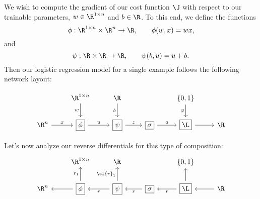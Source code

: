 We wish to compute the gradient of our cost function $\J$ with respect to our trainable parameters, $w\in\R^{1\times n}$ and $b\in\R$.  To this end, we define the functions
$$\phi:\R^{1\times n}\times\R^n\to\R,\qquad \phi(w,x)=wx,$$
and
$$\psi:\R\times\R\to\R,\qquad \psi(b,u)=u+b.$$
Then our logistic regression model for a single example follows the following network layout:

\begin{equation*}
	\begin{tikzcd}
		{}
		&\R^{1\times n}
		\arrow[d, swap, "w"]
		&\R^{}
		\arrow[d, swap, "b"]
		&{}
		&\{0,1\}
		\arrow[d, swap, "y"]
		&{}
		\\
		\R^n
		\arrow[r, "x"]
		&\boxed{\phi}
		\arrow[r, "u"]
		&\boxed{\psi}
		\arrow[r, "z"]
		&\boxed{\sigma}
		\arrow[r, "a"]
		&\boxed{\L}
		\arrow[r]
		&\R
	\end{tikzcd}
\end{equation*}

Let's now analyze our reverse differentials for this type of composition:
\begin{equation*}
	\begin{tikzcd}
		{}
		&\R^{1\times n}
		&\R^{}
		&{}
		&\{0,1\}
		&{}
		\\
		\R^n
		&\boxed{\phi}
		\arrow[l]
		\arrow[u, "r_1"]
		&\boxed{\psi}
		\arrow[l, "r"]
		\arrow[u, "\cl{r}_1"]
		&\boxed{\sigma}
		\arrow[l, "r"]
		&\boxed{\L}
		\arrow[l, "r"]
		\arrow[u]
		&\R
		\arrow[l]
	\end{tikzcd}
\end{equation*}

